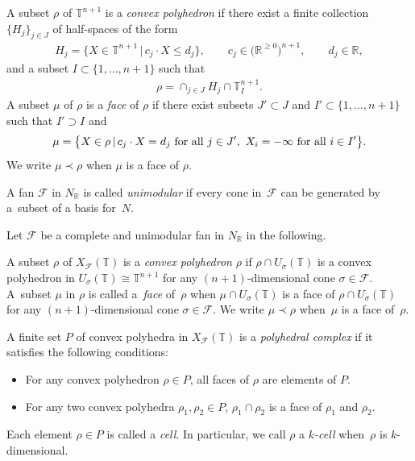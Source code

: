 \documentclass[10pt,a4paper]{amsart}
\numberwithin{equation}{section}
\begin{document}
\begin{Definition} A subset $\rho$ of ${\mathbb T}^{n+1}$ is a \textit{convex polyhedron} if there exist a f\/inite collection $\{H_j\}_{j \in J}$ of half-spaces of the form
\begin{gather*}
H_j=\big\{ X \in {\mathbb T}^{n+1} \,|\, c_j \cdot X \leq d_j \big\}, \qquad c_j \in \big({\mathbb R}^{\geq 0}\big)^{n+1}, \qquad d_j \in {\mathbb R},
\end{gather*}
and a subset $I \subset \{1, \dots, n+1 \}$ such that
\begin{gather*}
\rho = \cap_{j \in J} H_j \cap {\mathbb T}_I^{n+1}.
\end{gather*}
A subset $\mu$ of $\rho$ is a \textit{face} of $\rho$ if there exist subsets $J' \subset J$ and $I' \subset \{1, \dots, n+1 \}$ such that $I' \supset I$ and
\begin{gather*}
\mu=\big\{ X \in \rho \,|\,
c_j \cdot X = d_j \ {\rm for\ all}\ j \in J', \ X_i =-\infty \ {\rm for\ all}\ i \in I'\big\}.
\end{gather*}
We write $\mu \prec \rho$ when $\mu$ is a face of $\rho$.
\end{Definition}

\begin{Definition}
A fan ${\mathcal F}$ in $N_{\mathbb R}$ is called {\it unimodular} if every cone in~${\mathcal F}$ can be generated by a~subset of a basis for~$N$.
\end{Definition}

Let ${\mathcal F}$ be a complete and unimodular fan in $N_{\mathbb R}$ in the following.

\begin{Definition} A subset $\rho$ of $X_{\mathcal F}({\mathbb T})$ is a \textit{convex polyhedron} $\rho$ if $\rho \cap U_\sigma({\mathbb T})$ is a convex polyhedron in $U_\sigma({\mathbb T}) \cong {\mathbb T}^{n+1}$ for any $(n+1)$-dimensional cone $\sigma \in {\mathcal F}$. A~subset $\mu$ in $\rho$ is called a~\textit{face} of~$\rho$ when $\mu \cap U_\sigma({\mathbb T})$ is a face of $\rho \cap U_\sigma({\mathbb T})$ for any $(n+1)$-dimensional cone $\sigma \in {\mathcal F}$. We write $\mu \prec \rho$ when~$\mu$ is a face of~$\rho$.
\end{Definition}

\begin{Definition}\label{df:cpx}
A f\/inite set $P$ of convex polyhedra in $X_{\mathcal F}({\mathbb T})$ is a \textit{polyhedral complex} if it satisf\/ies the following conditions:
\begin{itemize}\itemsep=0pt
\item For any convex polyhedron $\rho \in P$, all faces of $\rho$ are elements of $P$.
\item For any two convex polyhedra $\rho_1, \rho_2 \in P$, $\rho_1 \cap \rho_2$ is a face of $\rho_1$ and $\rho_2$.
\end{itemize}
Each element $\rho \in P$ is called a \textit{cell}. In particular, we call $\rho$ a \textit{$k$-cell} when~$\rho$ is $k$-dimensional.
\end{Definition}
\end{document}
